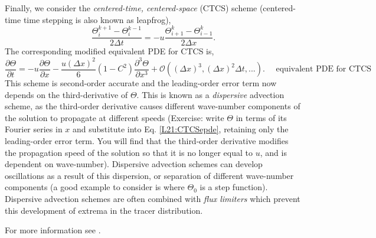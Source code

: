 Finally, we consider the \textit{centered-time, centered-space} (CTCS)
scheme (centered-time time stepping is also known as leapfrog),
\begin{equation}
  \frac{\Theta_i^{k+1}-\Theta_i^{k-1}}{2\Delta t} = -u
  \frac{\Theta_{i+1}^{k}-\Theta^k_{i-1}}{2\Delta x}.\label{L21:CTCS}
\end{equation}
The corresponding modified equivalent PDE for CTCS is,
\begin{equation}
  \frac{\partial\Theta}{\partial t} = -u
  \frac{\partial\Theta}{\partial x} - \frac{u(\Delta x)^2}{6}(1-C^2)\frac{\partial^3\Theta}{\partial x^3} +
  \mathcal{O}\left((\Delta x)^3,(\Delta x)^2\Delta t,...\right).\quad\text{ equivalent PDE for CTCS}\label{L21:CTCSepde}
\end{equation}
This scheme is second-order accurate and the leading-order error term
now depends on the third-derivative of $\Theta$. This is known as a
\textit{dispersive} advection scheme, as the third-order derivative
causes different wave-number components of the solution to propagate
at different speeds (Exercise: write $\Theta$ in terms of its Fourier
series in $x$ and substitute into Eq. \eqref{L21:CTCSepde}, retaining only
the leading-order error term. You will find that the third-order
derivative modifies the propagation speed of the solution so that it
is no longer equal to $u$, and is dependent on
wave-number). Dispersive advection schemes can develop oscillations as
a result of this dispersion, or separation of different wave-number components
(a good example to consider is where $\Theta_0$ is a step
function). Dispersive advection schemes are often combined with
\textit{flux limiters} which prevent this development of extrema in
the tracer distribution.

For more information see \citet{Lomax2001}.
